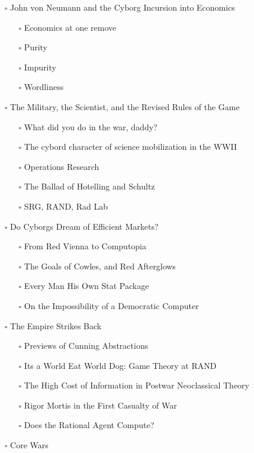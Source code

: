 \documentclass[paper=B6,portrait,twoside=true,twocolumn=false,headinclude=true,footinclude=false,fontsize=12,BCOR=10mm,DIV=calc,pagesize=auto,titlepage=firstiscover,mpinclude=false,headings=normal,headings=twolinechapter,open=right,toc=graduated,chapterprefix=false,numbers=endperiod,parskip=half+]{scrbook}
\theoremstyle{definition}
\begin{document}
\begin{itemize}
\begin{itemize}
\item[{$\square$}] John von Neumann and the Cyborg Incursion into Economics
\begin{itemize}
\item[{$\square$}] Economics at one remove
\item[{$\square$}] Purity
\item[{$\square$}] Impurity
\item[{$\square$}] Wordliness
\end{itemize}
\item[{$\square$}] The Military, the Scientist, and the Revised Rules of the Game
\begin{itemize}
\item[{$\square$}] What did you do in the war, daddy?
\item[{$\square$}] The cybord character of science mobilization in the WWII
\item[{$\square$}] Operations Research
\item[{$\square$}] The Ballad of Hotelling and Schultz
\item[{$\square$}] SRG, RAND, Rad Lab
\end{itemize}
\item[{$\square$}] Do Cyborgs Dream of Efficient Markets?
\begin{itemize}
\item[{$\square$}] From Red Vienna to Computopia
\item[{$\square$}] The Goals of Cowles, and Red Afterglows
\item[{$\square$}] Every Man His Own Stat Package
\item[{$\square$}] On the Impossibility of a Democratic Computer
\end{itemize}
\item[{$\square$}] The Empire Strikes Back
\begin{itemize}
\item[{$\square$}] Previews of Cunning Abstractions
\item[{$\square$}] Its a World Eat World Dog: Game Theory at RAND
\item[{$\square$}] The High Cost of Information in Postwar Neoclassical Theory
\item[{$\square$}] Rigor Mortis in the First Casualty of War
\item[{$\square$}] Does the Rational Agent Compute?
\end{itemize}
\item[{$\square$}] Core Wars
\begin{itemize}

\end{itemize}
\end{itemize}
\end{itemize}
\end{document}
